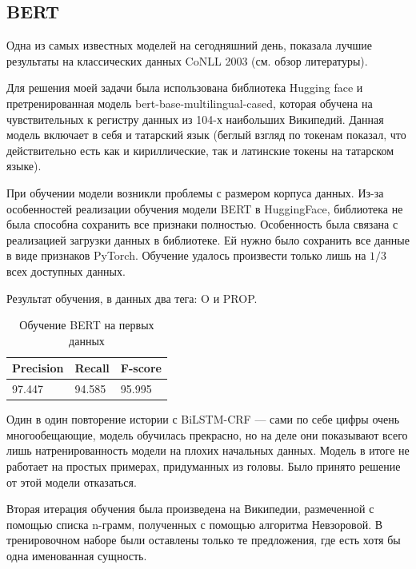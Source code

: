 \subsection{BERT}

\cite{DBLP:journals/corr/abs-1810-04805} Одна из самых известных моделей на сегодняшний день, показала лучшие результаты на классических данных CoNLL 2003 (см. обзор литературы).

Для решения моей задачи была использована библиотека Hugging face \cite{Wolf2019HuggingFacesTS} и претренированная модель bert-base-multilingual-cased, которая обучена на чувствительных к регистру данных из 104-х наибольших Википедий. Данная модель включает в себя и татарский язык (беглый взгляд по токенам показал, что действительно есть как и кириллические, так и латинские токены на татарском языке). 

При обучении модели возникли проблемы с размером корпуса данных. Из-за особенностей реализации обучения модели BERT в HuggingFace, библиотека не была способна сохранить все признаки полностью. Особенность была связана с реализацией загрузки данных в библиотеке. Ей нужно было сохранить все данные в виде признаков PyTorch. Обучение удалось произвести только лишь на $1/3$ всех доступных данных.

Результат обучения, в данных два тега: O и PROP.

\vspace{1cm}
\begin{table}[h]
\begin{tabular}{| l | l | l |}
\hline
Precision  &   Recall   &  F-score     \\

\hline
97.447     & 94.585    & 95.995        \\
\hline
\end{tabular}
\caption{Обучение BERT на первых данных}
\end{table}

\vspace{1cm}

Один в один повторение истории с BiLSTM-CRF --- сами по себе цифры очень многообещающие, модель обучилась прекрасно, но на деле они показывают всего лишь натренированность модели на плохих начальных данных. Модель в итоге не работает на простых примерах, придуманных из головы. Было принято решение от этой модели отказаться. %

Вторая итерация обучения была произведена на Википедии, размеченной с помощью списка n-грамм, полученных с помощью алгоритма Невзоровой. В тренировочном наборе были оставлены только те предложения, где есть хотя бы одна именованная сущность.

